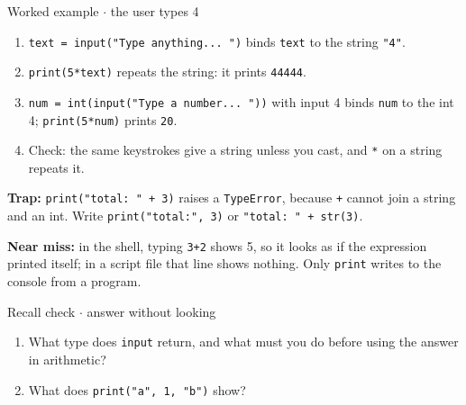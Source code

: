 \documentclass[11pt]{article}
\begin{document}
\begin{keepsection}
\begin{workedbox}{Worked example \ensuremath{\cdot} the user types 4}
\begin{enumerate}
\item \texttt{text = input("Type anything... ")} binds \texttt{text} to the string \texttt{"4"}.
\item \texttt{print(5*text)} repeats the string: it prints \texttt{44444}.
\item \texttt{num = int(input("Type a number... "))} with input 4 binds \texttt{num} to the int 4; \texttt{print(5*num)} prints \texttt{20}.
\item Check: the same keystrokes give a string unless you cast, and \texttt{*} on a string repeats it.
\end{enumerate}
\end{workedbox}

\begin{notebox}\textbf{Trap:} \texttt{print("total: " + 3)} raises a \texttt{TypeError}, because \texttt{+} cannot join a string and an int. Write \texttt{print("total:", 3)} or \texttt{"total: " + str(3)}.\end{notebox}

\begin{notebox}\textbf{Near miss:} in the shell, typing \texttt{3+2} shows 5, so it looks as if the expression printed itself; in a script file that line shows nothing. Only \texttt{print} writes to the console from a program.\end{notebox}

\begin{recallbox}{Recall check \ensuremath{\cdot} answer without looking}
\begin{enumerate}
\item What type does \texttt{input} return, and what must you do before using the answer in arithmetic?
\item What does \texttt{print("a", 1, "b")} show?
\end{enumerate}

\end{recallbox}
\end{keepsection}
\end{document}
